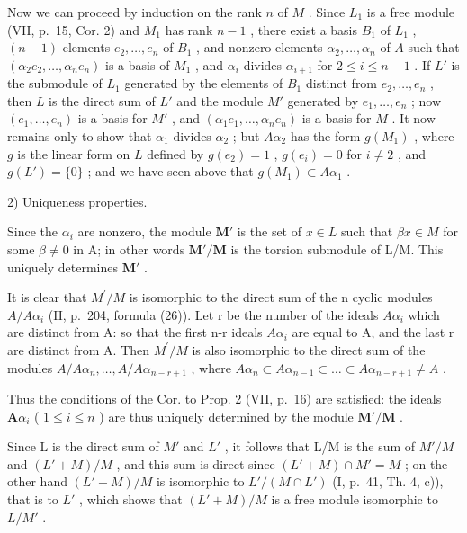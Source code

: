 Now we can proceed by induction on the rank \(n\) of \(M\) . Since \(L_1\) is a free module (VII, p.~15, Cor. 2) and \(M_1\) has rank \(n - 1\) , there exist a basis \(B_1\) of \(L_1\) , \((n - 1)\) elements \(e_2, \ldots, e_n\) of \(B_1\) , and nonzero elements \(\alpha_2, \ldots, \alpha_n\) of \(A\) such that \((\alpha_2e_2, \ldots, \alpha_ne_n)\) is a basis of \(M_1\) , and \(\alpha_i\) divides \(\alpha_{i+1}\) for \(2 \leqslant i \leqslant n - 1\) . If \(L'\) is the submodule of \(L_1\) generated by the elements of \(B_1\) distinct from \(e_2, \ldots, e_n\) , then \(L\) is the direct sum of \(L'\) and the module \(M'\) generated by \(e_1, \ldots, e_n\) ; now \((e_1, \ldots, e_n)\) is a basis for \(M'\) , and \((\alpha_1e_1, \ldots, \alpha_ne_n)\) is a basis for \(M\) . It now remains only to show that \(\alpha_1\) divides \(\alpha_2\) ; but \(A\alpha_2\) has the form \(g(M_1)\) , where \(g\) is the linear form on \(L\) defined by \(g(e_2) = 1\) , \(g(e_i) = 0\) for \(i \neq 2\) , and \(g(L') = \{0\}\) ; and we have seen above that \(g(M_1) \subset A\alpha_1\) .

2) Uniqueness properties.

Since the \(\alpha_{i}\) are nonzero, the module \(\mathbf{M}'\) is the set of \(x\in L\) such that \(\beta x\in M\) for some \(\beta \neq 0\) in A; in other words \(\mathbf{M}' / \mathbf{M}\) is the torsion submodule of L/M. This uniquely determines \(\mathbf{M}'\) .

It is clear that \(M^{\prime}/M\) is isomorphic to the direct sum of the n cyclic modules \(A/A\alpha_{i}\) (II, p.~204, formula (26)). Let r be the number of the ideals \(A\alpha_{i}\) which are distinct from A: so that the first n-r ideals \(A\alpha_{i}\) are equal to A, and the last r are distinct from A. Then \(M^{\prime}/M\) is also isomorphic to the direct sum of the modules \(A/A\alpha_{n}, \ldots, A/A\alpha_{n-r+1}\) , where \(A\alpha_{n} \subset A\alpha_{n-1} \subset \ldots \subset A\alpha_{n-r+1} \neq A\) .

Thus the conditions of the Cor. to Prop. 2 (VII, p.~16) are satisfied: the ideals \(\mathbf{A}\alpha_{i}\) ( \(1 \leqslant i \leqslant n\) ) are thus uniquely determined by the module \(\mathbf{M}'/\mathbf{M}\) .

Since L is the direct sum of \(M'\) and \(L'\) , it follows that L/M is the sum of \(M'/M\) and \((L'+M)/M\) , and this sum is direct since \((L'+M) \cap M' = M\) ; on the other hand \((L'+M)/M\) is isomorphic to \(L'/(M \cap L')\) (I, p.~41, Th. 4, c)), that is to \(L'\) , which shows that \((L'+M)/M\) is a free module isomorphic to \(L/M'\) .

